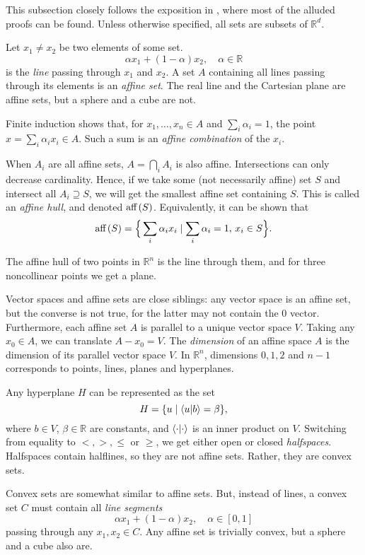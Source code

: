 		This subsection closely follows the exposition in \cite{rockafellar,grumbaum,ziegler,boyd}, where most of the alluded proofs can be found. Unless otherwise specified, all sets are subsets of $\mathbb{R}^d$.

		Let $x_1 \neq x_2$ be two elements of some set.
		$$
			\alpha x_1 + (1 - \alpha) x_2, \quad\alpha \in \mathbb{R}
		$$
		is the \emph{line} passing through $x_1$ and $x_2$. A set $A$ containing all lines passing through its elements is an \emph{affine set}. The real line and the Cartesian plane are affine sets, but a sphere and a cube are not.

		Finite induction shows that, for $x_1, \ldots, x_n \in A$ and $\sum_i \alpha_i = 1$, the point $x = \sum_i \alpha_i x_i \in A$.  Such a sum is an \emph{affine combination} of the $x_i$.

		When $A_i$ are all affine sets, $A = \bigcap_i A_i$ is also affine. Intersections can only decrease cardinality. Hence, if we take some (not necessarily affine) set $S$ and intersect all $A_i \supseteq S$, we will get the smallest affine set containing $S$. This is called an \emph{affine hull}, and denoted $\text{aff} \left( S \right)$. Equivalently, it can be shown that
		$$
			\text{aff} \left( S \right) = \Big\{ \sum_i \alpha_i x_i \mid \sum_i \alpha_i = 1, \, x_i \in S \Big\} .
		$$

		The affine hull of two points in $\mathbb{R}^n$ is the line through them, and for three noncollinear points we get a plane.

		Vector spaces and affine sets are close siblings: any vector space is an affine set, but the converse is not true, for the latter may not contain the $0$ vector. Furthermore, each affine set $A$ is parallel to a unique vector space $V$. Taking any $x_0 \in A$, we can translate $A - x_0 = V$. The \emph{dimension} of an affine space $A$ is the dimension of its parallel vector space $V$. In $\mathbb{R}^n$, dimensions $0, 1, 2$ and $n-1$ corresponds to points, lines, planes and hyperplanes.

		Any hyperplane $H$ can be represented as the set
		$$
			H = \{ u \mid \braket{u}{b} = \beta \} ,
		$$
		where $b \in V$, $\beta \in \mathbb{R}$ are constants, and $\braket{\cdot}{\cdot}$ is an inner product on $V$. Switching from equality to $<, >, \leq$ or $\geq$, we get either open or closed \emph{halfspaces}. Halfspaces contain halflines, so they are not affine sets. Rather, they are convex sets.

		Convex sets are somewhat similar to affine sets. But, instead of lines, a convex set $C$ must contain all \emph{line segments}
		$$
			\alpha x_1 + (1 - \alpha) x_2, \quad\alpha \in [0,1]
		$$
		passing through any $x_1, x_2 \in C$. Any affine set is trivially convex, but a sphere and a cube also are.

